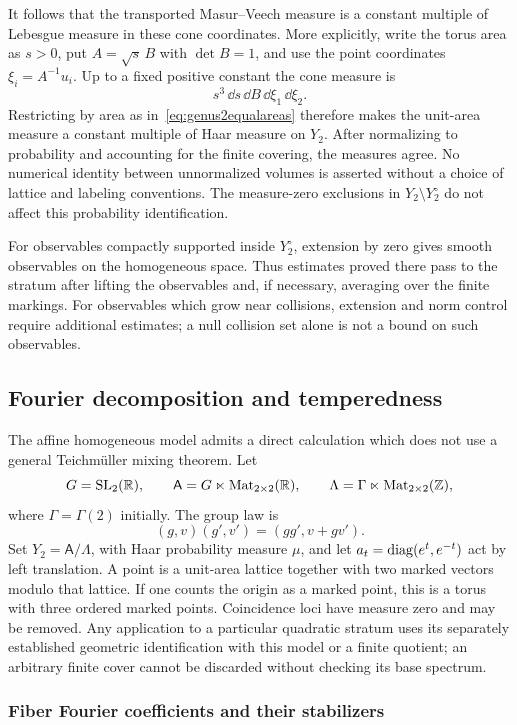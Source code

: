 It follows that the transported Masur--Veech measure is a constant
multiple of Lebesgue measure in these cone coordinates.  More
explicitly, write the torus area as $s>0$, put $A=\sqrt{s}\,B$
with $\det B=1$, and use the point coordinates $\xi_i=A^{-1}u_i$.
Up to a fixed positive constant the cone measure is
\[
 s^3\,\dd s\,\dd B\,\dd\xi_1\,\dd\xi_2.
\]
Restricting by area as in~\eqref{eq:genus2equalareas} therefore
makes the unit-area measure a constant multiple of Haar measure
on $Y_2$.  After
normalizing to probability and accounting for the finite covering,
the measures agree.  No numerical identity between unnormalized
volumes is asserted without a choice of lattice and labeling
conventions.  The measure-zero exclusions in $Y_2\setminus
Y_2^\circ$ do not affect this probability identification.

For observables compactly supported inside $Y_2^\circ$, extension
by zero gives smooth observables on the homogeneous space.  Thus
estimates proved there pass to the stratum after lifting the
observables and, if necessary, averaging over the finite markings.
For observables which grow near collisions, extension and norm
control require additional estimates; a null collision set alone
is not a bound on such observables.


\subsection{Fourier decomposition and temperedness}
\label{subsec:markedtorusconverse}

The affine homogeneous model admits a direct calculation which does
not use a general Teichm\"uller mixing theorem. Let
\[
 G=\operatorname{SL}_2(\mathbb R),\qquad
 \mathsf A=G\ltimes\operatorname{Mat}_{2\times2}(\mathbb R),\qquad
 \Lambda=\Gamma\ltimes\operatorname{Mat}_{2\times2}(\mathbb Z),
\]
where $\Gamma=\Gamma(2)$ initially. The group law is
\[
 (g,v)(g',v')=(gg',v+gv').
\]
Set $Y_2=\mathsf A/\Lambda$, with Haar probability measure $\mu$, and
let $a_t=\operatorname{diag}(e^t,e^{-t})$ act by left translation. A point is a
unit-area lattice together with two marked vectors modulo that
lattice. If one counts the origin as a marked point, this is a
torus with three ordered marked points. Coincidence loci have
measure zero and may be removed. Any application to a particular
quadratic stratum uses its separately established geometric
identification with this model or a finite quotient; an arbitrary
finite cover cannot be discarded without checking its base spectrum.

\subsubsection*{Fiber Fourier coefficients and their stabilizers}

